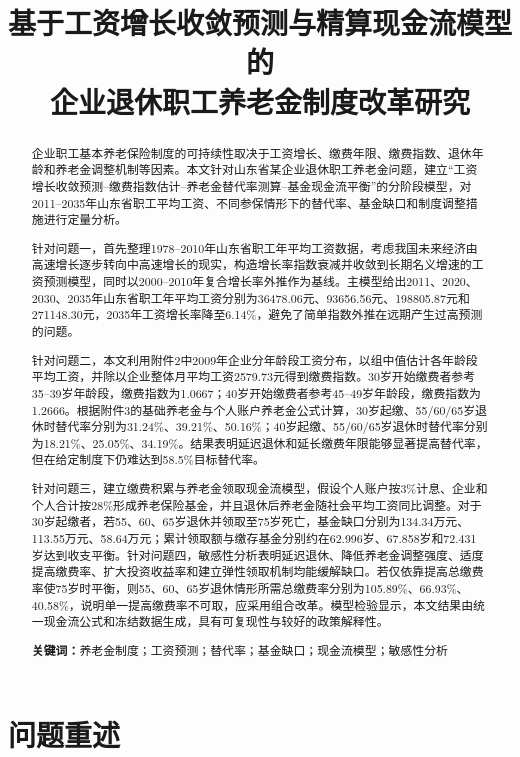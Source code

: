 \documentclass[UTF8,12pt,a4paper]{ctexart}
\title{\heiti 基于工资增长收敛预测与精算现金流模型的\\企业退休职工养老金制度改革研究}
\author{}
\date{}
\begin{document}
\maketitle
\thispagestyle{empty}

\begin{abstract}
企业职工基本养老保险制度的可持续性取决于工资增长、缴费年限、缴费指数、退休年龄和养老金调整机制等因素。本文针对山东省某企业退休职工养老金问题，建立“工资增长收敛预测--缴费指数估计--养老金替代率测算--基金现金流平衡”的分阶段模型，对2011--2035年山东省职工平均工资、不同参保情形下的替代率、基金缺口和制度调整措施进行定量分析。

针对问题一，首先整理1978--2010年山东省职工年平均工资数据，考虑我国未来经济由高速增长逐步转向中高速增长的现实，构造增长率指数衰减并收敛到长期名义增速的工资预测模型，同时以2000--2010年复合增长率外推作为基线。主模型给出2011、2020、2030、2035年山东省职工年平均工资分别为36478.06元、93656.56元、198805.87元和271148.30元，2035年工资增长率降至6.14\%，避免了简单指数外推在远期产生过高预测的问题。

针对问题二，本文利用附件2中2009年企业分年龄段工资分布，以组中值估计各年龄段平均工资，并除以企业整体月平均工资2579.73元得到缴费指数。30岁开始缴费者参考35--39岁年龄段，缴费指数为1.0667；40岁开始缴费者参考45--49岁年龄段，缴费指数为1.2666。根据附件3的基础养老金与个人账户养老金公式计算，30岁起缴、55/60/65岁退休时替代率分别为31.24\%、39.21\%、50.16\%；40岁起缴、55/60/65岁退休时替代率分别为18.21\%、25.05\%、34.19\%。结果表明延迟退休和延长缴费年限能够显著提高替代率，但在给定制度下仍难达到58.5\%目标替代率。

针对问题三，建立缴费积累与养老金领取现金流模型，假设个人账户按3\%计息、企业和个人合计按28\%形成养老保险基金，并且退休后养老金随社会平均工资同比调整。对于30岁起缴者，若55、60、65岁退休并领取至75岁死亡，基金缺口分别为134.34万元、113.55万元、58.64万元；累计领取额与缴存基金分别约在62.996岁、67.858岁和72.431岁达到收支平衡。针对问题四，敏感性分析表明延迟退休、降低养老金调整强度、适度提高缴费率、扩大投资收益率和建立弹性领取机制均能缓解缺口。若仅依靠提高总缴费率使75岁时平衡，则55、60、65岁退休情形所需总缴费率分别为105.89\%、66.93\%、40.58\%，说明单一提高缴费率不可取，应采用组合改革。模型检验显示，本文结果由统一现金流公式和冻结数据生成，具有可复现性与较好的政策解释性。

\textbf{关键词：}养老金制度；工资预测；替代率；基金缺口；现金流模型；敏感性分析
\end{abstract}
\newpage
\tableofcontents
\newpage

\section{问题重述}
\end{document}
